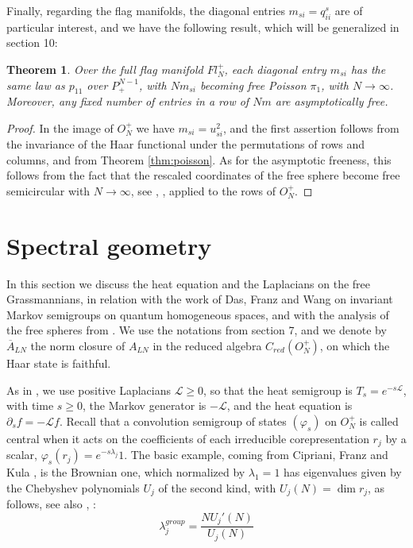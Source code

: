 \documentclass[11pt]{article}
\theoremstyle{plain}
\newtheorem{theorem}{Theorem}[section]
\begin{document}
\bigskip

Finally, regarding the flag manifolds, the diagonal entries $m_{si}=q^s_{ii}$ are of particular interest, and we have the following result, which will be generalized in section 10:

\begin{theorem}
Over the full flag manifold $Fl^+_N$, each diagonal entry $m_{si}$ has the same law as $p_{11}$ over $P^{N-1}_+$, with $Nm_{si}$ becoming free Poisson $\pi_1$, with $N\to\infty$. Moreover, any fixed number of entries in a row of $Nm$ are asymptotically free.
\end{theorem}

\begin{proof}
In the image of $O_N^+$ we have $m_{si}=u_{si}^2$, and the first assertion follows from the invariance of the Haar functional under the permutations of rows and columns, and from Theorem \ref{thm:poisson}. As for the asymptotic freeness, this follows from the fact that the rescaled coordinates of the free sphere become free semicircular with $N\to\infty$, see \cite{ba1}, \cite{bgo}, applied to the rows of $O_N^+$.
\end{proof}

\section{Spectral geometry}

In this section we discuss the heat equation and the Laplacians on the free Grassmannians, in relation with the work of Das, Franz and Wang \cite{dfw} on invariant Markov semigroups on quantum homogeneous spaces, and with the analysis of the free spheres from \cite{mfs}. We use the notations from section 7, and we denote by $\overline{A}_{LN}$ the norm closure of $A_{LN}$ in the reduced algebra $C_{red}(O_N^+)$, on which the Haar state is faithful.

\bigskip

As in \cite{mfs}, we use positive Laplacians $\mathcal L\geq0$, so that the heat semigroup is $T_s=e^{-s\mathcal L}$, with time $s\geq0$, the Markov generator is $-\mathcal L$, and the heat equation is $\partial_sf=-\mathcal Lf$. Recall that a convolution semigroup of states $(\varphi_s)$ on $O_N^+$ is called central when it acts on the coefficients of each irreducible corepresentation $r_j$ by a scalar, $\varphi_s(r_j)=e^{-s\lambda_j}1$. The basic example, coming from Cipriani, Franz and Kula \cite{cfk}, is the Brownian one, which normalized by $\lambda_1=1$ has eigenvalues given by the Chebyshev polynomials $U_j$ of the second kind, with $U_j(N)=\dim r_j$, as follows, see also \cite{mfs}, \cite{dfw}:
$$\lambda_j^{group}=\frac{NU_j'(N)}{U_j(N)}$$
\end{document}
